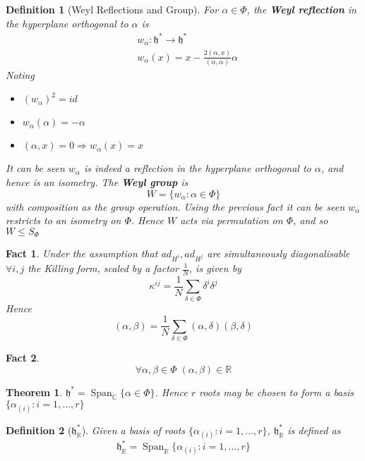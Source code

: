 \documentclass{article}
\newtheorem{theorem}{Theorem}[subsection]
\newtheorem{definition}{Definition}[subsection]
\newtheorem{fact}{Fact}[subsection]
\DeclareMathOperator{\spn}{Span}
\newcommand{\bam}[1]{\textbf{#1}}
\newcommand{\mf}[1]{\mathfrak{#1}}
\newcommand{\mbb}[1]{\mathbb{#1}}
\begin{document}
\begin{definition}[Weyl Reflections and Group]
For $\alpha\in\Phi$, the \bam{Weyl reflection} in the hyperplane orthogonal to $\alpha$ is 
\begin{align*}
    & w_\alpha : \mf{h}^\ast \to \mf{h}^\ast \\
    & w_\alpha (x) = x - \frac{2(\alpha,x)}{(\alpha,\alpha)}\alpha
\end{align*}
Noting 
\begin{itemize}
    \item $(w_\alpha)^2=id$
    \item $w_\alpha (\alpha) = -\alpha$
    \item $(\alpha,x)=0 \Rightarrow w_\alpha (x) = x$
\end{itemize}
It can be seen $w_\alpha$ is indeed a reflection in the hyperplane orthogonal to $\alpha$, and hence is an isometry. The \bam{Weyl group} is 
\[
W=\lbrace w_\alpha : \alpha\in\Phi \rbrace
\]
with composition as the group operation. Using the previous fact it can be seen $w_\alpha$ restricts to an isometry on $\Phi$. Hence $W$ acts via permutation on $\Phi$, and so $W\leq S_\Phi$
\end{definition}

\begin{fact}
Under the assumption that $ad_{H^i}, ad_{H^j}$ are simultaneously diagonalisable $\forall i,j$ the Killing form, scaled by a factor $\frac{1}{N}$, is given by 
\[
\kappa^{ij}=\frac{1}{N} \sum_{\delta\in\Phi} \delta^i\delta^j
\]
Hence 
\[
(\alpha, \beta)= \frac{1}{N}\sum_{\delta\in\Phi} (\alpha, \delta) (\beta, \delta)
\]
\end{fact}

\begin{fact}
\[
\forall \alpha, \beta\in\Phi \; (\alpha, \beta)\in\mbb{R}
\]
\end{fact}

\begin{theorem}
$\mf{h}^\ast=\spn_\mbb{C}\lbrace \alpha\in\Phi \rbrace$. Hence $r$ roots may be chosen to form a basis $\lbrace \alpha_{(i)} : i=1,\dots,r \rbrace$
\end{theorem}

\begin{definition}[$\mf{h}^\ast_\mbb{R}$]
Given a basis of roots $\lbrace \alpha_{(i)} : i=1,\dots,r \rbrace$, $\mf{h}^\ast_\mbb{R}$ is defined as 
\[
\mf{h}^\ast_\mbb{R} = \spn_\mbb{R} \lbrace \alpha_{(i)} : i=1,\dots,r \rbrace
\]
\end{definition}
\end{document}
